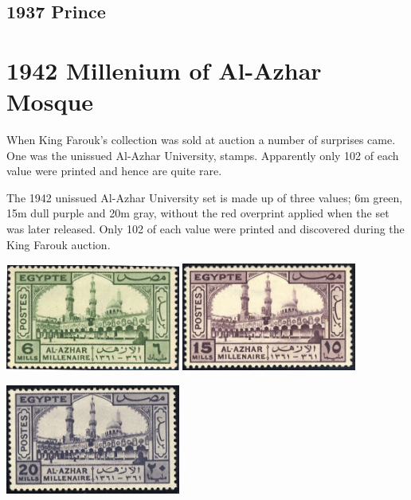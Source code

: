\documentclass[justified]{tufte-book}
\begin{document}
\section{1937 Prince}










\chapter{1942 Millenium of Al-Azhar Mosque}
\normalsize
{}

When King Farouk's collection was sold at auction a number of surprises came. One was the unissued Al-Azhar University, stamps. Apparently only 102 of each value were printed and hence are quite rare.

The 1942 unissued Al-Azhar University set is made up of three values; 6m green, 15m dull purple and 20m gray, without the red overprint applied when the set was later released. Only 102 of each value were printed and discovered during the King Farouk auction.

\bigskip
\begin{center}
\includegraphics[width=0.43\textwidth]{./graphics/EG/al-azhar-6mils} \includegraphics[width=0.43\textwidth]{./graphics/EG/al-azhar-15mils}
\medskip

\noindent\includegraphics[width=0.43\textwidth]{./graphics/EG/al-azhar-20mills} 
\end{center}
\end{document}
